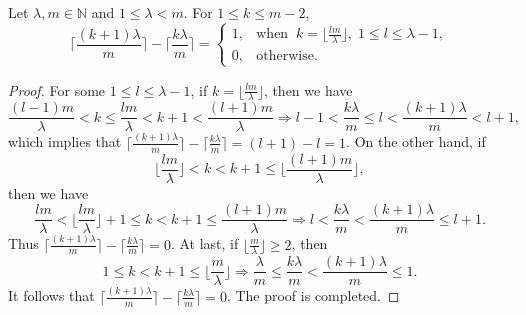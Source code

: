 \documentclass[10pt,a4paper]{amsart}
\begin{document}
\begin{lemma}\label{ceil_prop}
    Let $\lambda,m\in\mathbb{N}$ and $1\le \lambda<m$. For $1\le k\le m-2$, 
    \[
        \bigg\lceil\frac{(k+1)\lambda}{m}\bigg\rceil-\bigg\lceil\frac{k\lambda}{m}\bigg\rceil=\begin{cases}
            1, &\text{when}\;\;k=\big\lfloor\frac{l m}{\lambda}\big\rfloor,\;1\le l\le\lambda-1,\\
            0, &\text{otherwise}.
        \end{cases}
    \]
\end{lemma}

\begin{proof}
    For some $1\le l\le\lambda-1$, if $k=\big\lfloor\frac{l m}{\lambda}\big\rfloor$, then we have
    \[
        \frac{(l-1)m}{\lambda}<k\le\frac{l m}{\lambda}<k+1<\frac{(l+1)m}{\lambda}\Longrightarrow l-1<\frac{k\lambda}{m}\le l<\frac{(k+1)\lambda}{m}<l+1,
    \]
    which implies that $\big\lceil\frac{(k+1)\lambda}{m}\big\rceil-\big\lceil\frac{k\lambda}{m}\big\rceil=(l+1)-l=1$. On the other hand, if 
    \[
        \bigg\lfloor\frac{l m}{\lambda}\bigg\rfloor<k<k+1\le\bigg\lfloor\frac{(l+1)m}{\lambda}\bigg\rfloor,
    \]
    then we have
    \[
        \frac{l m}{\lambda}<\bigg\lfloor\frac{l m}{\lambda}\bigg\rfloor+1\le k<k+1\le\frac{(l+1)m}{\lambda}\Longrightarrow l<\frac{k\lambda}{m}<\frac{(k+1)\lambda}{m}\le l+1.
    \]
    Thus $\big\lceil\frac{(k+1)\lambda}{m}\big\rceil-\big\lceil\frac{k\lambda}{m}\big\rceil=0$. At last, if $\big\lfloor\frac{m}{\lambda}\big\rfloor\ge2$, then 
    \[
        1\le k<k+1\le\bigg\lfloor\frac{m}{\lambda}\bigg\rfloor\Longrightarrow \frac{\lambda}{m}\le \frac{k\lambda}{m}<\frac{(k+1)\lambda}{m}\le 1. 
    \]
    It follows that $\big\lceil\frac{(k+1)\lambda}{m}\big\rceil-\big\lceil\frac{k\lambda}{m}\big\rceil=0$. The proof is completed. 
\end{proof}
\end{document}
